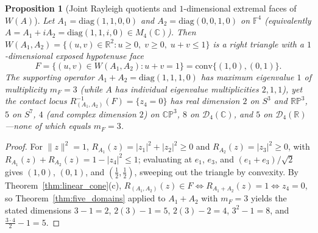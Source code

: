 \documentclass[11pt,a4paper]{article}
\newtheorem{proposition}[theorem]{Proposition}
\theoremstyle{definition}
\theoremstyle{remark}
\newcommand{\RR}{\mathbb{R}}
\newcommand{\CC}{\mathbb{C}}
\newcommand{\FF}{\mathbb{F}}
\newcommand{\RP}{\mathbb{RP}}
\newcommand{\CP}{\mathbb{CP}}
\newcommand{\cD}{\mathcal{D}}
\newcommand{\diag}{\mathrm{diag}}
\newcommand{\conv}{\mathrm{conv}}
\begin{document}
\begin{proposition}[Joint Rayleigh quotients and $1$-dimensional extremal faces of $W(A)$]
\label{prop:joint_face}
Let $A_1 = \diag(1, 1, 0, 0)$ and $A_2 = \diag(0, 0, 1, 0)$ on $\FF^4$ (equivalently $A = A_1 + i A_2 = \diag(1, 1, i, 0) \in M_4(\CC)$). Then $W(A_1, A_2) = \{(u, v) \in \RR^2 : u \ge 0,\; v \ge 0,\; u + v \le 1\}$ is a right triangle with a $1$-dimensional exposed hypotenuse face
\[
  F = \{(u, v) \in W(A_1, A_2) : u + v = 1\} = \conv\{(1, 0), (0, 1)\}.
\]
The supporting operator $A_1 + A_2 = \diag(1, 1, 1, 0)$ has maximum eigenvalue $1$ of multiplicity $m_F = 3$ (while $A$ has individual eigenvalue multiplicities $2, 1, 1$), yet the contact locus $R_{(A_1, A_2)}^{-1}(F) = \{z_4 = 0\}$ has real dimension $2$ on $S^3$ and $\RP^3$, $5$ on $S^7$, $4$ (and complex dimension $2$) on $\CP^3$, $8$ on $\cD_4(\CC)$, and $5$ on $\cD_4(\RR)$---none of which equals $m_F = 3$.
\end{proposition}

\begin{proof}
For $\|z\|^2 = 1$, $R_{A_1}(z) = |z_1|^2 + |z_2|^2 \ge 0$ and $R_{A_2}(z) = |z_3|^2 \ge 0$, with $R_{A_1}(z) + R_{A_2}(z) = 1 - |z_4|^2 \le 1$; evaluating at $e_1$, $e_3$, and $(e_1 + e_3)/\sqrt{2}$ gives $(1, 0)$, $(0, 1)$, and $(\frac{1}{2}, \frac{1}{2})$, sweeping out the triangle by convexity. By Theorem~\ref{thm:linear_cone}(c), $R_{(A_1, A_2)}(z) \in F \iff R_{A_1 + A_2}(z) = 1 \iff z_4 = 0$, so Theorem~\ref{thm:five_domains} applied to $A_1 + A_2$ with $m_F = 3$ yields the stated dimensions $3 - 1 = 2$, $2(3) - 1 = 5$, $2(3) - 2 = 4$, $3^2 - 1 = 8$, and $\frac{3 \cdot 4}{2} - 1 = 5$.
\end{proof}
\end{document}
